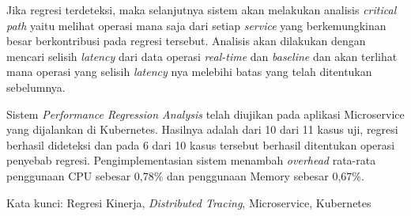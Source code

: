 Jika regresi terdeteksi, maka selanjutnya sistem akan melakukan analisis \textit{critical path} yaitu melihat operasi mana saja dari setiap \textit{service} yang berkemungkinan besar berkontribusi pada regresi tersebut. Analisis akan dilakukan dengan mencari selisih \textit{latency} dari data operasi \textit{real-time} dan \textit{baseline} dan akan terlihat mana operasi yang selisih \textit{latency} nya melebihi batas yang telah ditentukan sebelumnya.

Sistem \textit{Performance Regression Analysis} telah diujikan pada aplikasi Microservice yang dijalankan di Kubernetes. Hasilnya adalah dari 10 dari 11 kasus uji, regresi berhasil dideteksi dan pada 6 dari 10 kasus tersebut berhasil ditentukan operasi penyebab regresi. Pengimplementasian sistem menambah \textit{overhead} rata-rata penggunaan CPU sebesar 0,78\% dan penggunaan Memory sebesar 0,67\%.



\vspace{15mm}
Kata kunci: Regresi Kinerja, \textit{Distributed Tracing}, Microservice, Kubernetes
\clearpage